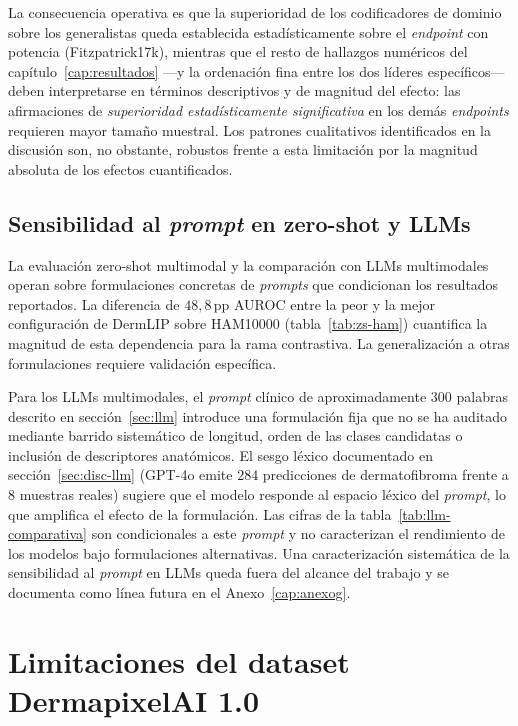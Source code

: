 La consecuencia operativa es que la superioridad de los codificadores de
dominio sobre los generalistas queda establecida estadísticamente sobre
el \emph{endpoint} con potencia (Fitzpatrick17k), mientras que el resto
de hallazgos numéricos del capítulo~\ref{cap:resultados} ---y la
ordenación fina entre los dos líderes específicos--- deben interpretarse
en términos descriptivos y de magnitud del efecto: las afirmaciones de
\emph{superioridad estadísticamente significativa} en los demás
\emph{endpoints} requieren mayor tamaño muestral. Los patrones
cualitativos identificados en la discusión son, no obstante, robustos
frente a esta limitación por la magnitud absoluta de los efectos
cuantificados.

\subsection{Sensibilidad al \emph{prompt} en zero-shot y LLMs}
\label{sec:lim-prompts}

La evaluación zero-shot multimodal y la comparación con LLMs
multimodales operan sobre formulaciones concretas de \emph{prompts}
que condicionan los resultados reportados. La diferencia de
$48{,}8$\,pp AUROC entre la peor y la mejor configuración de
DermLIP sobre HAM10000 (tabla~\ref{tab:zs-ham}) cuantifica la
magnitud de esta dependencia para la rama contrastiva. La
generalización a otras formulaciones requiere validación
específica.

Para los LLMs multimodales, el \emph{prompt} clínico de
aproximadamente $300$ palabras descrito en sección~\ref{sec:llm}
introduce una formulación fija que no se ha auditado mediante
barrido sistemático de longitud, orden de las clases candidatas o
inclusión de descriptores anatómicos. El sesgo léxico documentado
en sección~\ref{sec:disc-llm} (GPT-4o emite $284$ predicciones de
dermatofibroma frente a $8$ muestras reales) sugiere que el
modelo responde al espacio léxico del \emph{prompt}, lo que
amplifica el efecto de la formulación. Las cifras de la
tabla~\ref{tab:llm-comparativa} son condicionales a este
\emph{prompt} y no caracterizan el rendimiento de los modelos bajo
formulaciones alternativas. Una caracterización sistemática de la
sensibilidad al \emph{prompt} en LLMs queda fuera del alcance del
trabajo y se documenta como línea futura en el
Anexo~\ref{cap:anexog}.

\section{Limitaciones del dataset DermapixelAI 1.0}
\label{sec:lim-dermapixel}

